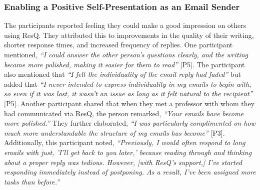 \subsubsection{Enabling a Positive Self-Presentation as an Email Sender}
\label{sec:result2_self-presentation}
The participants reported feeling they could make a good impression on others using ResQ. 
They attributed this to improvements in the quality of their writing, shorter response times, and increased frequency of replies. 
One participant mentioned, \textit{``I could answer the other person's questions clearly, and the writing became more polished, making it easier for them to read''} [P5]. 
The participant also mentioned that \textit{``I felt the individuality of the email reply had faded''} but added that \textit{``I never intended to express individuality in my emails to begin with, so even if it was lost, it wasn't an issue as long as it felt natural to the recipient''} [P5].
Another participant shared that when they met a professor with whom they had communicated via ResQ, the person remarked, \textit{``Your emails have become more polished.''} 
They further elaborated, \textit{``I was particularly complimented on how much more understandable the structure of my emails has become''} [P3].
Additionally, this participant noted, \textit{``Previously, I would often respond to long emails with just, 'I'll get back to you later,' because reading through and thinking about a proper reply was tedious. However, [with ResQ's support,] I've started responding immediately instead of postponing. As a result, I've been assigned more tasks than before.''}

